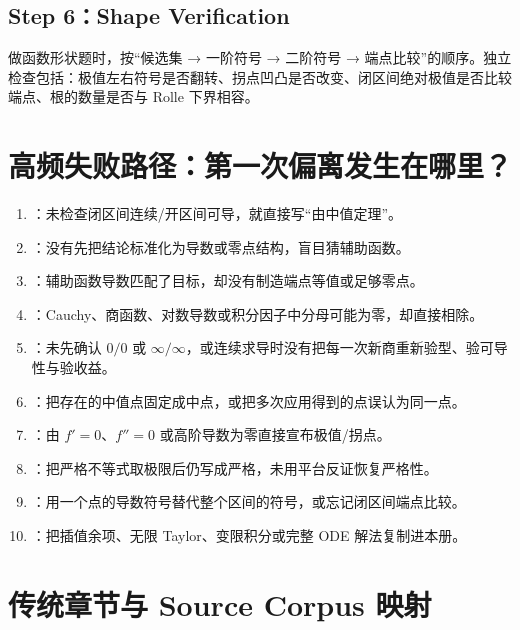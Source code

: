 \documentclass[UTF8,fontset=none,11pt,a4paper]{ctexart}
\begin{document}
\subsection{Step 6：Shape Verification}

做函数形状题时，按“候选集 → 一阶符号 → 二阶符号 → 端点比较”的顺序。独立检查包括：极值左右符号是否翻转、拐点凹凸是否改变、闭区间绝对极值是否比较端点、根的数量是否与 Rolle 下界相容。

\section{高频失败路径：第一次偏离发生在哪里？}

\begin{enumerate}
  \item {}：未检查闭区间连续/开区间可导，就直接写“由中值定理”。
  \item {}：没有先把结论标准化为导数或零点结构，盲目猜辅助函数。
  \item {}：辅助函数导数匹配了目标，却没有制造端点等值或足够零点。
  \item {}：Cauchy、商函数、对数导数或积分因子中分母可能为零，却直接相除。
  \item {}：未先确认 $0/0$ 或 $\infty/\infty$，或连续求导时没有把每一次新商重新验型、验可导性与验收益。
  \item {}：把存在的中值点固定成中点，或把多次应用得到的点误认为同一点。
  \item {}：由 $f'=0$、$f''=0$ 或高阶导数为零直接宣布极值/拐点。
  \item {}：把严格不等式取极限后仍写成严格，未用平台反证恢复严格性。
  \item {}：用一个点的导数符号替代整个区间的符号，或忘记闭区间端点比较。
  \item {}：把插值余项、无限 Taylor、变限积分或完整 ODE 解法复制进本册。
\end{enumerate}

\section{传统章节与 Source Corpus 映射}
\end{document}
